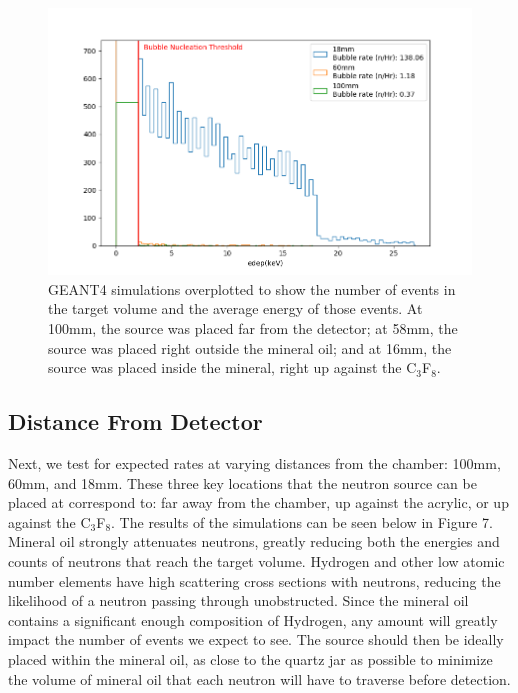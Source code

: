 \documentclass[%
12pt,
twoside,
reprint,
amsmath,amssymb,
aps,
]{article}
\begin{document}
	\begin{figure}[!b]
		\includegraphics[scale = 0.6, center]{Images/distance.png}
		\caption{\label{tab:table-name} GEANT4 simulations overplotted to show the number of events in the target volume and the average energy of those events. At 100mm, the source was placed far from the detector; at 58mm, the source was placed right outside the mineral oil; and at 16mm, the source was placed inside the mineral, right up against the C$_{3}$F$_{8}$.}
	\end{figure}
	
	\subsection{Distance From Detector}
	\par Next, we test for expected rates at varying distances from the chamber: 100mm, 60mm, and 18mm. These three key locations that the neutron source can be placed at correspond to: far away from the chamber, up against the acrylic, or up against the C$_{3}$F$_{8}$. The results of the simulations can be seen below in Figure 7. Mineral oil strongly attenuates neutrons, greatly reducing both the energies and counts of neutrons that reach the target volume. Hydrogen and other low atomic number elements have high scattering cross sections with neutrons, reducing the likelihood of a neutron passing through unobstructed. Since the mineral oil contains a significant enough composition of Hydrogen, any amount will greatly impact the number of events we expect to see. The source should then be ideally placed within the mineral oil, as close to the quartz jar as possible to minimize the volume of mineral oil that each neutron will have to traverse before detection.
	
\end{document}
